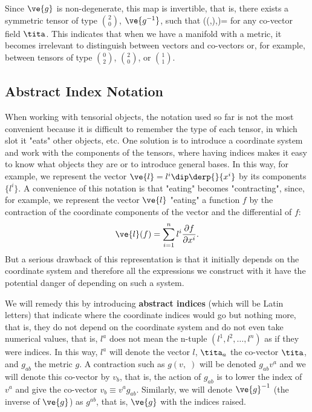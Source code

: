 Since $\ve{g}$ is non-degenerate, this map is invertible, that is, there exists a symmetric tensor of type ${2\choose 0}$, $\ve{g^{-1}}$, such that 
\beq
{}((\tita,\;),\;)=\tita
\eeq
for any co-vector field $\tita$. This indicates that when we have a manifold with a metric, it becomes irrelevant to distinguish between vectors and co-vectors or, for example, between tensors of type ${0 \choose 2}$, ${2 \choose 0}$, or ${1\choose1}$.


\subsection{Abstract Index Notation}


When working with tensorial objects, the notation used so far is not the most convenient because it is difficult to remember the type of each tensor, in which slot it "eats" other objects, etc. One solution is to introduce a coordinate system and work with the components of the tensors, where having indices makes it easy to know what objects they are or to introduce general bases. In this way, for example, we represent the vector $\ve{l}=l^i\dip\derp{}{x^i}$ by its components $\{l^i\}$. A convenience of this notation is that "eating" becomes "contracting", since, for example, we represent the vector $\ve{l}$ "eating" a function $f$ by the contraction of the coordinate components of the vector and the differential of $f$:
\[
\ve{l}(f) = \sum_{i=1}^n l^i \frac{\partial f}{\partial x^i}.
\]
But a serious drawback of this representation is that it initially depends on the coordinate system and therefore all the expressions we construct with it have the potential danger of depending on such a system.

We will remedy this by introducing {\bf abstract indices} (which will be Latin letters) that indicate where the coordinate indices would go but nothing more, that is, they do not depend on the coordinate system and do not even take numerical values, that is, $l^a$ does not mean the n-tuple $(l^1,l^2,\ldots,l^n)$ as if they were indices. In this way, $l^a$ will denote the vector $l$, $\tita_a$ the co-vector $\tita$, and $g_{ab}$ the metric $g$. A contraction such as $g(v,\;)$ will be denoted $g_{ab}v^a$ and we will denote this co-vector by $v_b$, that is, the action of $g_{ab}$ is to lower the index of $v^a$ and give the co-vector $v_b \equiv v^ag_{ab}$. Similarly, we will denote $\ve{g}^{-1}$ (the inverse of $\ve{g}$) as $g^{ab}$, that is, $\ve{g}$ with the indices raised.

